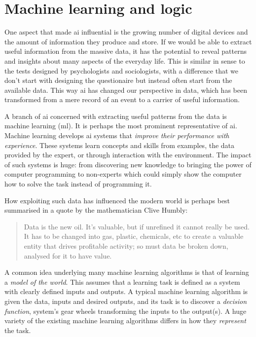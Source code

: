 \section{Machine learning and logic}
\label{sec:intro_ml}


One aspect that made \gls{ai} influential is the growing number of digital devices and the amount of information they produce and store.
If we would be able to extract useful information from the massive data, it has the potential to reveal patterns and insights about many aspects of the everyday life.
This is similar in sense to the tests designed by psychologists and sociologists, with a difference that we don't start with designing the questionaire but instead  often start from the available data.
This way \gls{ai} has changed our perspective in data, which has been transformed from a mere record of an event to a carrier of useful information.


A branch of \gls{ai} concerned with extracting useful patterns from the data is machine learning (\gls{ml}).
It is perhaps the most prominent representative of \gls{ai}.
Machine learning develops \gls{ai} systems that \textit{improve their performance with experience}.
These systems learn concepts and skills from examples, the data provided by the expert, or through interaction with the environment.
The impact of such systems is huge: from discovering new knowledge to bringing the power of computer programming to non-experts which could simply show the computer how to solve the task instead of programming it.



How exploiting such data has influenced the modern world is perhaps best summarised  in a quote by the mathematician Clive Humbly:
\begin{quote}
	Data is the new oil. It’s valuable, but if unrefined it cannot really be used. It has to be changed into gas, plastic, chemicals, etc to create a valuable entity that drives profitable activity; so must data be broken down, analysed for it to have value.
\end{quote}




A common idea underlying many machine learning algorithms is that of learning a \textit{model of the world}. 
This assumes that a learning task is defined as a system with clearly defined inputs and outputs.
A typical machine learning algorithm is given the data, inputs and desired outputs, and its task is to discover a \textit{decision function}, system's gear wheels transforming the inputs to the output(s).
A huge variety of the existing machine learning algorithms differs in how they \textit{represent} the task.




